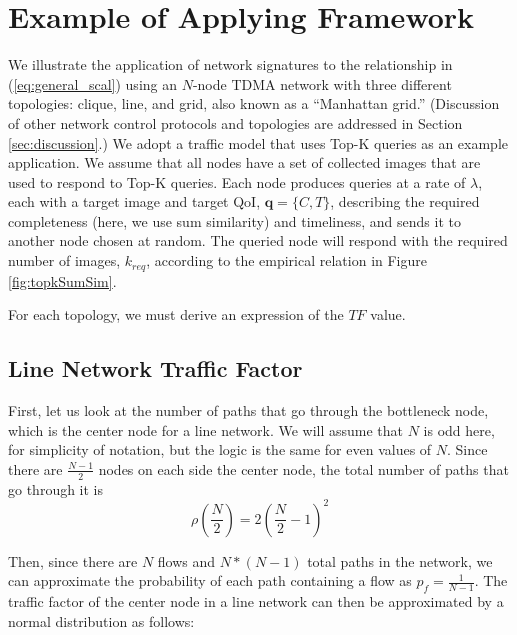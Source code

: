 \section{Example of Applying Framework}
\label{sec:example_applications}

We illustrate the application of network signatures to the relationship in (\ref{eq:general_scal}) using an $N$-node TDMA network with three different topologies: clique, line, and grid, also known as a ``Manhattan grid.''  (Discussion of other network control protocols and topologies are addressed in Section \ref{sec:discussion}.)  We adopt a traffic model that uses Top-K queries as an example application.  We assume that all nodes have a set of collected images that are used to respond to Top-K queries.  Each node produces queries at a rate of $\lambda$, each with a target image and target QoI, $\mathbf{q} = \{C, T\}$, describing the required completeness (here, we use sum similarity) and timeliness, and sends it to another node chosen at random.  The queried node will respond with the required number of images, $k_{req}$, according to the empirical relation in Figure \ref{fig:topkSumSim}.

For each topology, we must derive an expression of the $TF$ value.

\subsection{Line Network Traffic Factor}

First, let us look at the number of paths that go through the bottleneck node, which is the center node for a line network.  We will assume that $N$ is odd here, for simplicity of notation, but the logic is the same for even values of $N$.  Since there are $\frac{N-1}{2}$ nodes on each side the center node, the total number of paths that go through it is
\begin{equation*}
	\rho(\frac{N}{2}) = 2(\frac{N}{2}-1)^2
\end{equation*}

Then, since there are $N$ flows and $N*(N-1)$ total paths in the network, we can approximate the probability of each path containing a flow as $p_f = \frac{1}{N-1}$.  The traffic factor of the center node in a line network can then be approximated by a normal distribution as follows:

